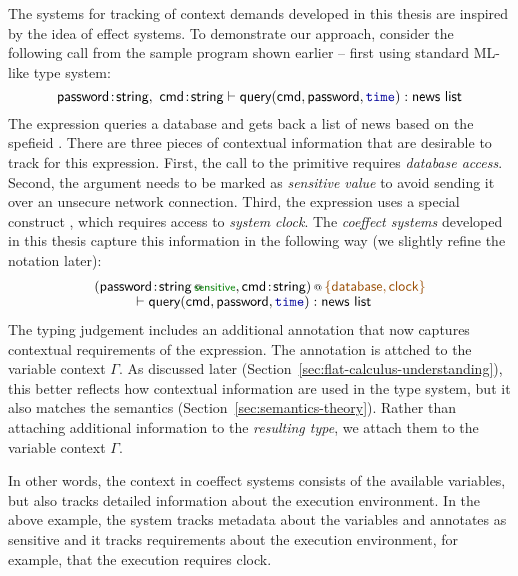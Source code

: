 The systems for tracking of context demands developed in this thesis are inspired by the idea
of effect systems. To demonstrate our approach, consider the following call from the sample program
shown earlier -- first using standard ML-like type system:
%
\begin{equation*}
\ident{password}\!:\!\ident{string},~\ident{cmd}\!:\!\ident{string}
  \vdash \ident{query}(\ident{cmd}, \ident{password}, \kvd{time}) : \ident{news list}
\end{equation*}
%
The expression queries a database and gets back a list of news based on the spefieid . 
There are three pieces of contextual information that are desirable to track for this expression. 
First, the call to the  primitive requires \emph{database access}. Second, 
the  argument needs to be marked as \emph{sensitive value} to avoid sending it over
an unsecure network connection. Third, the expression uses a special construct , which
requires access to \emph{system clock}. The \emph{coeffect systems} developed in this thesis 
capture this information in the following way (we slightly refine the notation later):
%
\begin{equation*}
\begin{array}{l}
 \coctx{( \ident{password}\!:\!\coctx{\ident{string}}{\hspace{-0.75em}\ident{\cclrd{\footnotesize sensitive}}},
   \ident{cmd}\!:\!\ident{string})}{ \aclrd{\{ \ident{database}, \ident{clock} \}}}  \\[-0.1em]
 \hspace{3em} \vdash\ident{query}(\ident{cmd}, \ident{password}, \kvd{time}) : \ident{news list}
\end{array}
\end{equation*}
%
The typing judgement includes an additional annotation that now captures 
contextual requirements of the expression. The annotation is attched to the variable context 
$\Gamma$. As discussed later (Section~\ref{sec:flat-calculus-understanding}), this better reflects
how contextual information are used in the type system, but it also matches the semantics 
(Section~\ref{sec:semantics-theory}). Rather than attaching additional information to the
\emph{resulting type}, we attach them to the variable context $\Gamma$. 

In other words, the context in coeffect systems consists of the available variables, but also
tracks detailed information about the execution environment.
In the above example, the system tracks metadata about the variables and annotates 
as sensitive and it tracks requirements about the execution environment, for example,
that the execution requires clock.

